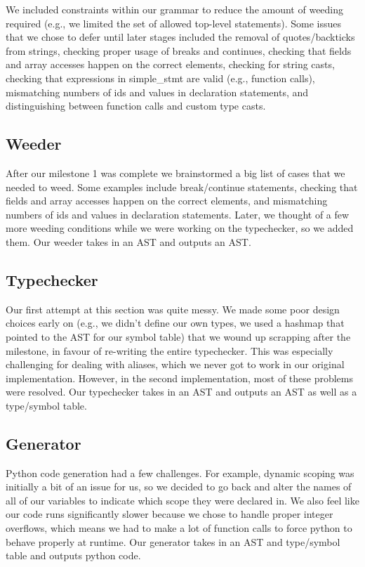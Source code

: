 \documentclass{article}
\begin{document}
We included constraints within our grammar to reduce the amount of weeding required (e.g., we limited the set of allowed top-level statements). Some issues that we chose to defer until later stages included the removal of quotes/backticks from strings, checking proper usage of breaks and continues, checking that fields and array accesses happen on the correct elements, checking for string casts, checking that expressions in simple\_stmt are valid (e.g., function calls), mismatching numbers of ids and values in declaration statements, and distinguishing between function calls and custom type casts.

\subsection{Weeder}

After our milestone 1 was complete we brainstormed a big list of cases that we needed to weed. Some examples include break/continue statements, checking that fields and array accesses happen on the correct elements, and mismatching numbers of ids and values in declaration statements. Later, we thought of a few more weeding conditions while we were working on the typechecker, so we added them. Our weeder takes in an AST and outputs an AST.

\subsection{Typechecker}

Our first attempt at this section was quite messy. We made some poor design choices early on (e.g., we didn't define our own types, we used a hashmap that pointed to the AST for our symbol table) that we wound up scrapping after the milestone, in favour of re-writing the entire typechecker. This was especially challenging for dealing with aliases, which we never got to work in our original implementation. However, in the second implementation, most of these problems were resolved. Our typechecker takes in an AST and outputs an AST as well as a type/symbol table.

\subsection{Generator}

Python code generation had a few challenges. For example, dynamic scoping was initially a bit of an issue for us, so we decided to go back and alter the names of all of our variables to indicate which scope they were declared in. We also feel like our code runs significantly slower because we chose to handle proper integer overflows, which means we had to make a lot of function calls to force python to behave properly at runtime. Our generator takes in an AST and type/symbol table and outputs python code.
\end{document}
